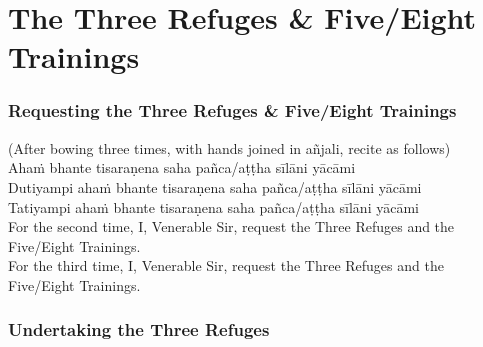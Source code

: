 \chapter{The Three Refuges \& Five/Eight Trainings}

\subsection{Requesting the Three Refuges \& Five/Eight Trainings}

(After bowing three times, with hands joined in añjali, recite as follows)\\

Ahaṁ bhante tisaraṇena saha pañca/aṭṭha sīlāni yācāmi\\
Dutiyampi ahaṁ bhante tisaraṇena saha pañca/aṭṭha sīlāni yācāmi\\
Tatiyampi ahaṁ bhante tisaraṇena saha pañca/aṭṭha sīlāni yācāmi\\

For the second time, I, Venerable Sir, request the Three Refuges and the Five/Eight Trainings.\\
For the third time, I, Venerable Sir, request the Three Refuges and the Five/Eight Trainings.

\subsection{Undertaking the Three Refuges}

